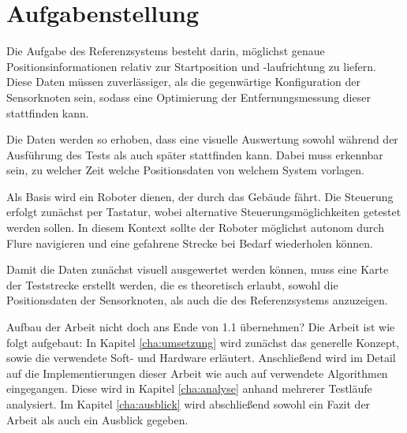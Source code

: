 \section{Aufgabenstellung}
\label{sec:aufgabenstellung}

Die Aufgabe des Referenzsystems besteht darin, möglichst genaue Positionsinformationen relativ zur Startposition und -laufrichtung zu liefern. Diese Daten müssen zuverlässiger, als die gegenwärtige Konfiguration der Sensorknoten sein, sodass eine Optimierung der Entfernungsmessung dieser stattfinden kann.

Die Daten werden so erhoben, dass eine visuelle Auswertung sowohl während der Ausführung des Tests als auch später stattfinden kann. Dabei muss erkennbar sein, zu welcher Zeit welche Positionsdaten von welchem System vorlagen.


Als Basis wird ein Roboter dienen, der durch das Gebäude fährt. Die Steuerung erfolgt zunächst per Tastatur, wobei alternative Steuerungsmöglichkeiten getestet werden sollen. In diesem Kontext sollte der Roboter möglichst autonom durch Flure navigieren und eine gefahrene Strecke bei Bedarf wiederholen können.

Damit die Daten zunächst visuell ausgewertet werden können, muss eine Karte der Teststrecke erstellt werden, die es theoretisch erlaubt, sowohl die Positionsdaten der Sensorknoten, als auch die des Referenzsystems anzuzeigen.

{\color{red}Aufbau der Arbeit nicht doch ans Ende von 1.1 übernehmen? }Die Arbeit ist wie folgt aufgebaut: In Kapitel \ref{cha:umsetzung} wird zunächst das generelle Konzept, sowie die verwendete Soft- und Hardware erläutert. Anschließend wird im Detail auf die Implementierungen dieser Arbeit wie auch auf verwendete Algorithmen eingegangen. Diese wird in Kapitel \ref{cha:analyse} anhand mehrerer Testläufe analysiert. Im Kapitel \ref{cha:ausblick} wird abschließend sowohl ein Fazit der Arbeit als auch ein Ausblick gegeben.